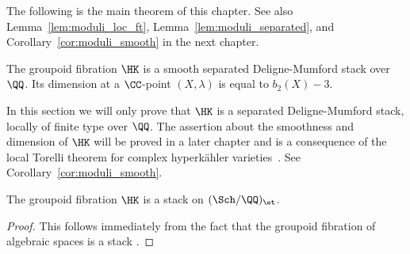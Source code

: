 The following is the main theorem of this chapter. See also Lemma~\ref{lem:moduli_loc_ft}, Lemma~\ref{lem:moduli_separated}, and Corollary~\ref{cor:moduli_smooth} in the next chapter.
\begin{theorem}\label{thm:moduli_dm}
The groupoid fibration $\HK$ is a smooth separated Deligne-Mumford stack over $\QQ$. Its dimension at a $\CC$-point $(X,\lambda)$ is equal to $b_2(X) - 3$.
\end{theorem}

\begin{remark}
In this section we will only prove that $\HK$ is a separated Deligne-Mumford stack, locally of finite type over $\QQ$. The assertion about the smoothness and dimension of $\HK$ will be proved in a later chapter and is a consequence of the local Torelli theorem for complex hyperk\"ahler varieties~\cite[Th\'eor\`eme~5]{Beauville}. See Corollary~\ref{cor:moduli_smooth}.
\end{remark}

\begin{lemma}
    The groupoid fibration $\HK$ is a stack on $(\Sch/\QQ)_{\et}$.
\end{lemma}
\begin{proof}
This follows immediately from the fact that the groupoid fibration of algebraic spaces is a stack \cite[Tag 04UA]{SP}. %
\end{proof}



